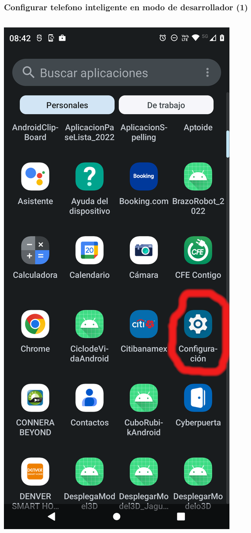 \begin{frame}
\frametitle{Configurar telefono inteligente en modo de desarrollador (1)}  
\begin{columns}
\begin{center}
\includegraphics[width=0.95\linewidth]{00_Configurar/ModoDesarrollador1.png}    

\end{center}
\end{columns}
\end{frame}
